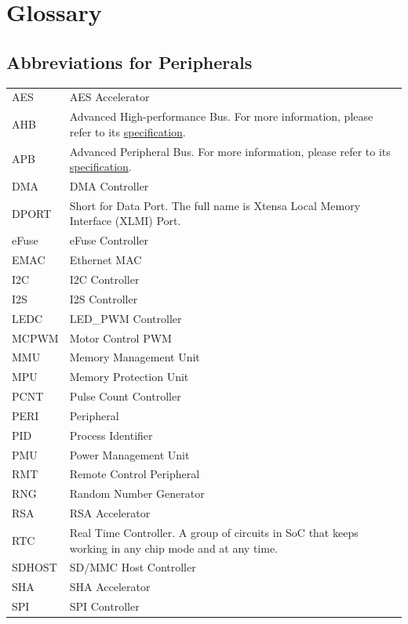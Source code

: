 \section*{Glossary}\label{glossary}
\rhead{\Navigation}

\subsection*{Abbreviations for Peripherals}

\begin{longtable}[c]{ R{3cm} p{12cm} }
AES & AES Accelerator \\

AHB & Advanced High-performance Bus. For more information, please refer to its \href{https://developer.arm.com/documentation/ihi0033/a?lang=en}{specification}. \\
APB & Advanced Peripheral Bus. For more information, please refer to its \href{https://developer.arm.com/documentation/ihi0024/b}{specification}. \\

DMA & DMA Controller \\
DPORT & Short for Data Port. The full name is Xtensa Local Memory Interface (XLMI) Port. \\
eFuse & eFuse Controller \\
EMAC & Ethernet MAC \\

I2C & I2C Controller \\
I2S & I2S Controller \\
LEDC & LED\_PWM Controller\\
MCPWM & Motor Control PWM \\
MMU & Memory Management Unit \\
MPU & Memory Protection Unit \\
PCNT & Pulse Count Controller \\
PERI & Peripheral \\
PID & Process Identifier \\
PMU & Power Management Unit \\
RMT & Remote Control Peripheral \\
RNG & Random Number Generator \\
RSA & RSA Accelerator \\
RTC & Real Time Controller. A group of circuits in SoC that keeps working in any chip mode and at any time.   \\
SDHOST & SD/MMC Host Controller \\
SHA & SHA Accelerator \\
SPI & SPI Controller \\


\end{longtable}
